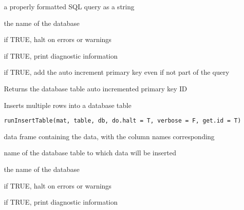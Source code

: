 \documentclass[letterpaper]{book}
\begin{document}
\begin{Arguments}
\begin{ldescription}
\item[\code{query}] a properly formatted SQL query as a string

\item[\code{db}] the name of the database

\item[\code{do.halt}] if TRUE, halt on errors or warnings

\item[\code{verbose}] if TRUE, print diagnostic information

\item[\code{auto.increment}] if TRUE, add the auto increment primary key even if not part of the query
\end{ldescription}
\end{Arguments}
%
\begin{Value}
Returns the database table auto incremented primary key ID
\end{Value}
%
\begin{Description}\relax
Inserts multiple rows into a database table
\end{Description}
%
\begin{Usage}
\begin{verbatim}
runInsertTable(mat, table, db, do.halt = T, verbose = F, get.id = T)
\end{verbatim}
\end{Usage}
%
\begin{Arguments}
\begin{ldescription}
\item[\code{mat}] data frame containing the data, with the column names corresponding

\item[\code{table}] name of the database table to which data will be inserted

\item[\code{db}] the name of the database

\item[\code{do.halt}] if TRUE, halt on errors or warnings

\item[\code{verbose}] if TRUE, print diagnostic information
\end{ldescription}
\end{Arguments}
\end{document}

